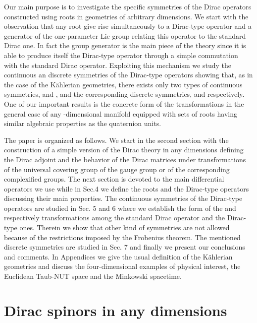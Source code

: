 \documentclass[a4paper,12pt]{article}
\begin{document}
Our main purpose is to investigate the specific symmetries of 
the Dirac operators constructed using roots in geometries of arbitrary 
dimensions. We start with the observation that any root give rise 
simultaneously to a Dirac-type operator and a generator of the one-parameter 
Lie group relating this operator to the standard Dirac one. In fact the 
group generator is the main piece of the theory since it is able to produce 
itself the Dirac-type operator through a simple commutation with 
the standard Dirac operator. Exploiting this mechanism we study the 
continuous an discrete symmetries of the Dirac-type operators showing that, 
as in the case of the K\" ahlerian geometries, there exists only two 
types of continuous symmetries, \coordHE{} and \coordHE{}, and the corresponding 
discrete symmetries, \coordHE{} and \coordHE{} respectively. One 
of our important results is the concrete form of the \coordHE{} transformations 
in the general case of any \coordHE{}-dimensional manifold equipped with 
sets of roots having similar algebraic properties as the quaternion units.       

The paper is organized as follows. We start in the second section with the 
construction of a simple version of the Dirac theory in any dimensions 
defining the Dirac adjoint and the behavior of the Dirac matrices under 
transformations of the universal covering group of the gauge group or of 
the corresponding complexified groups. The next section is devoted to the main 
differential operators we use while in Sec.4 we define the roots and the 
Dirac-type operators discussing their main properties. The continuous 
symmetries of the Dirac-type operators are studied in Sec. 5 and 6 where we 
establish the form of the \coordHE{} and respectively \coordHE{} transformations 
among the standard Dirac operator and the Dirac-type ones. Therein we 
show that other kind of symmetries are not allowed because of the restrictions 
imposed by the Frobenius theorem. The mentioned discrete symmetries are studied 
in Sec. 7 and finally we present our conclusions and comments. In Appendices 
we give the usual definition of the K\"ahlerian geometries and discuss the 
four-dimensional examples of physical interest, the Euclidean Taub-NUT space 
and 
the Minkowski spacetime. 
     
     
\section{Dirac spinors in any dimensions}
\end{document}
